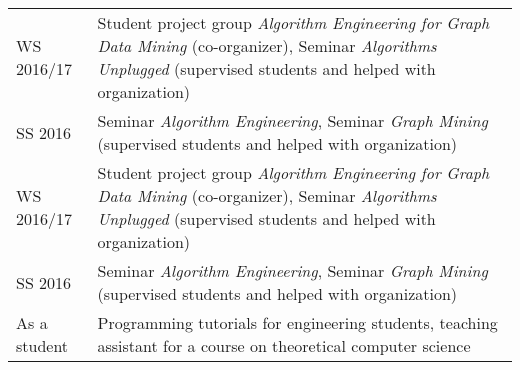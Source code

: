 \documentclass[11pt, a4paper, DIV=14, headings=small]{scrartcl}
\begin{document}
\begin{longtabu}{p{2.1cm}p{12.0cm}}
		WS 2016/17 & Student project group \emph{Algorithm Engineering for Graph Data Mining} (co-organizer), Seminar \emph{Algorithms Unplugged} (supervised students and helped with organization) \\
		SS 2016    & Seminar \emph{Algorithm Engineering}, Seminar \emph{Graph Mining} (supervised students and helped with organization)                                                            \\
		WS 2016/17   & Student project group \emph{Algorithm Engineering for Graph Data Mining} (co-organizer), Seminar \emph{Algorithms Unplugged} (supervised students and helped with organization) \\
		SS 2016      & Seminar \emph{Algorithm Engineering}, Seminar \emph{Graph Mining} (supervised students and helped with organization)                                                            \\
		As a student & Programming tutorials for engineering students, teaching assistant for a course on theoretical computer science                                                                 \\
	\end{longtabu}
	
\end{document}
